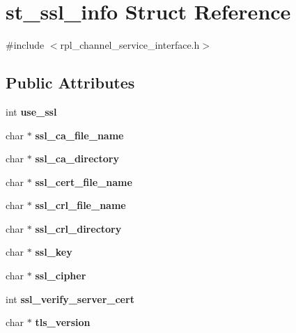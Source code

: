 \hypertarget{structst__ssl__info}{}\section{st\+\_\+ssl\+\_\+info Struct Reference}
\label{structst__ssl__info}


{\ttfamily \#include $<$rpl\+\_\+channel\+\_\+service\+\_\+interface.\+h$>$}

\subsection*{Public Attributes}
\begin{DoxyCompactItemize}
\item 
\mbox{\label{structst__ssl__info_a5b2a3059d7c5b971749d541cde0398ae}} 
int {\bfseries use\+\_\+ssl}
\item 
\mbox{\label{structst__ssl__info_a367e7569711967d6d3a04407dc3aa507}} 
char $\ast$ {\bfseries ssl\+\_\+ca\+\_\+file\+\_\+name}
\item 
\mbox{\label{structst__ssl__info_a6c9f626ec25d57fb5307d11c03d565ec}} 
char $\ast$ {\bfseries ssl\+\_\+ca\+\_\+directory}
\item 
\mbox{\label{structst__ssl__info_ae464df3cc9d610fdb3f98bcf06244f7d}} 
char $\ast$ {\bfseries ssl\+\_\+cert\+\_\+file\+\_\+name}
\item 
\mbox{\label{structst__ssl__info_a78ca1811d940d01c9dd32fee102953cb}} 
char $\ast$ {\bfseries ssl\+\_\+crl\+\_\+file\+\_\+name}
\item 
\mbox{\label{structst__ssl__info_ae65fb40ab266172fda6bb07f0635a953}} 
char $\ast$ {\bfseries ssl\+\_\+crl\+\_\+directory}
\item 
\mbox{\label{structst__ssl__info_a499108f47ee50f4cb809293ab8159a01}} 
char $\ast$ {\bfseries ssl\+\_\+key}
\item 
\mbox{\label{structst__ssl__info_ad6c18721eb045d359c7ece192c5cddeb}} 
char $\ast$ {\bfseries ssl\+\_\+cipher}
\item 
\mbox{\label{structst__ssl__info_aa0d2bf9a92f2db71d6ee25508060867f}} 
int {\bfseries ssl\+\_\+verify\+\_\+server\+\_\+cert}
\item 
\mbox{\label{structst__ssl__info_a43aecb9e8473568348fa7c30676e939b}} 
char $\ast$ {\bfseries tls\+\_\+version}
\end{DoxyCompactItemize}



